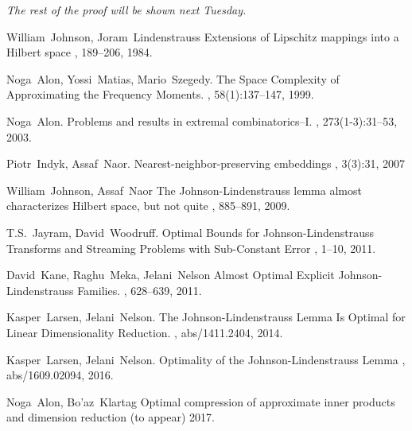 \documentclass[11pt]{article}
\begin{document}
  \textit{The rest of the proof will be shown next Tuesday.}



\begin{thebibliography}{42}

    William~Johnson, Joram~Lindenstrauss
    \newblock Extensions of Lipschitz mappings into a Hilbert space
    , 189--206, 1984.

    Noga~Alon, Yossi~Matias, Mario~Szegedy.
    \newblock The Space Complexity of Approximating the Frequency Moments.
    , 58(1):137--147, 1999.

    Noga~Alon.
    \newblock Problems and results in extremal combinatorics–I.
    , 273(1-3):31--53, 2003.

    Piotr~Indyk, Assaf~Naor.
    \newblock Nearest-neighbor-preserving embeddings
    , 3(3):31, 2007

    William~Johnson, Assaf~Naor
    \newblock The Johnson-Lindenstrauss lemma almost characterizes Hilbert space, but not quite
    , 885--891, 2009.

    T.S.~Jayram, David~Woodruff.
    \newblock Optimal Bounds for Johnson-Lindenstrauss Transforms and Streaming Problems with Sub-Constant Error
    , 1--10, 2011.

    David~Kane, Raghu~Meka, Jelani~Nelson
    \newblock Almost Optimal Explicit Johnson-Lindenstrauss Families.
    , 628--639, 2011.

    Kasper~Larsen, Jelani~Nelson.
    \newblock The Johnson-Lindenstrauss Lemma Is Optimal for Linear Dimensionality Reduction. 
    , abs/1411.2404, 2014.

    Kasper~Larsen, Jelani~Nelson.
    \newblock Optimality of the Johnson-Lindenstrauss Lemma
    , abs/1609.02094, 2016.

    Noga~Alon, Bo'az~Klartag
    \newblock Optimal compression of approximate inner products and dimension reduction
     (to appear) 2017.

\end{thebibliography}
\end{document}
